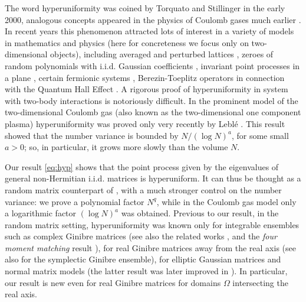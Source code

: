 \documentclass[10pt]{amsart}
\numberwithin{equation}{section}
\begin{document}
The word hyperuniformity was coined by Torquato and Stillinger \cite{torquato2003local} in the early 2000, analogous concepts appeared in the physics of Coulomb gases much earlier \cite{jancovici1993large, lebowitz1983charge, levesque2000charge, martin1980charge, martin1988sum}. In recent years this phenomenon attracted lots of interest in a variety of models in mathematics and physics (here for concreteness we focus only on two-dimensional objects), including averaged and perturbed lattices \cite{gacs1975problem}, zeroes of random polynomials with i.i.d. Gaussian coefficients \cite{forrester1999exact, shiffman2008number}, invariant point processes in a plane \cite{Weierstr_zeta23}, certain fermionic systems \cite{calabrese2015random, torquato2008point}, Berezin-Toeplitz operators in connection with the Quantum Hall Effect \cite{charles2020entanglement}. A rigorous proof of hyperuniformity in system with two-body interactions is  notoriously difficult. In the prominent model of the two-dimensional Coulomb gas (also known as the two-dimensional one component plasma) hyperuniformity was proved only very recently by Lebl\'e \cite{leble2021two}. This result showed that the number variance  is bounded by $N/(\log N)^a$, for some small $a>0$; so, in particular, it grows more slowly than the volume $N$.
 

Our result \eqref{eq:hyp} shows that the point process given by the eigenvalues of general non-Hermitian i.i.d. matrices is hyperuniform. It can thus be thought as a random matrix counterpart of \cite{leble2021two}, with a  much stronger control on the number variance: we prove a polynomial  factor $N^q$, while in the Coulomb gas model only a logarithmic factor $(\log N)^a$ was obtained. Previous to our result, in the random matrix setting, hyperuniformity was known only for integrable ensembles such as complex Ginibre matrices \cite{costin1995gaussian, lin2024nonlocal, norm_rep, soshnikov2000gaussian} (see also the related works \cite{abreu2023entanglement, calabrese2015random, forrester2014local, rider2004deviations}, and the \emph{four moment matching} result \cite{TaoVu15}), for real Ginibre matrices away from the real axis \cite{goel2024central} (see also \cite{akemann2023universality} for the symplectic Ginibre ensemble), for elliptic Gaussian matrices and normal matrix models \cite{akemann2024fluctuations} (the latter result was later improved in \cite{fluct_norm_mat26}). In particular, our result is new even for real Ginibre matrices for domains $\Omega$ intersecting the real axis.  
\end{document}
